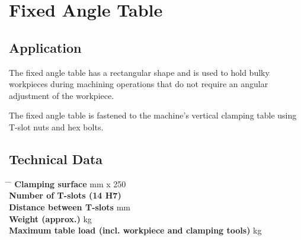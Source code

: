 
\section{Fixed Angle Table}

\begin{figure}[h]
    \centering
\end{figure}

\subsection*{Application}
The fixed angle table has a rectangular shape and is used to hold bulky workpieces during machining operations that do not require an angular adjustment of the workpiece.

The fixed angle table is fastened to the machine’s vertical clamping table using T-slot nuts and hex bolts.

\subsection*{Technical Data}
\begin{tabbing}
\hspace{4cm} \= \hspace{4cm} \= \kill
\textbf{Clamping surface} \> mm  x 250 \\
\textbf{Number of T-slots (14 H7)} \>  \\
\textbf{Distance between T-slots} \> mm  \\
\textbf{Weight (approx.)} \> kg  \\
\textbf{Maximum table load (incl. workpiece and clamping tools)} \> kg 
\end{tabbing}
